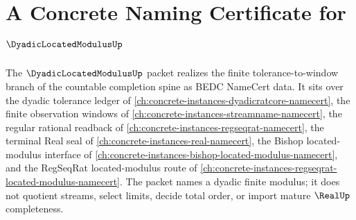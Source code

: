 \chapter{A Concrete Naming Certificate for $\DyadicLocatedModulusUp$}
\label{ch:concrete-instances-dyadic-located-modulus-namecert}

The $\DyadicLocatedModulusUp$ packet realizes the finite tolerance-to-window branch of the countable completion spine as BEDC NameCert data. It sits over the dyadic tolerance ledger of \autoref{ch:concrete-instances-dyadicratcore-namecert}, the finite observation windows of \autoref{ch:concrete-instances-streamname-namecert}, the regular rational readback of \autoref{ch:concrete-instances-regseqrat-namecert}, the terminal Real seal of \autoref{ch:concrete-instances-real-namecert}, the Bishop located-modulus interface of \autoref{ch:concrete-instances-bishop-located-modulus-namecert}, and the RegSeqRat located-modulus route of \autoref{ch:concrete-instances-regseqrat-located-modulus-namecert}. The packet names a dyadic finite modulus; it does not quotient streams, select limits, decide total order, or import mature $\RealUp$ completeness.

